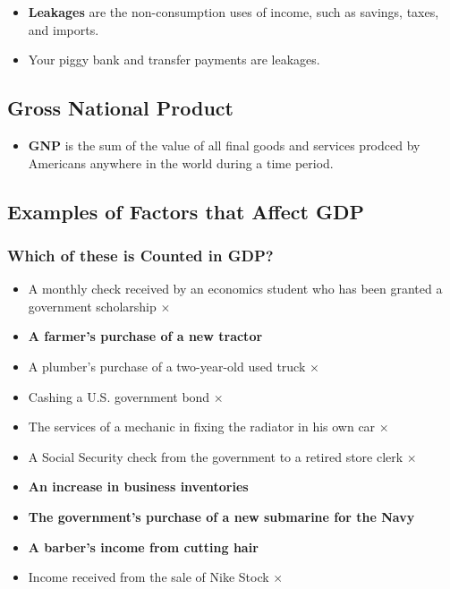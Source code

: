\documentclass[
  letterpaper,
  DIV=11,
  numbers=noendperiod]{scrartcl}
\providecommand{\tightlist}{%
  \setlength{\itemsep}{0pt}\setlength{\parskip}{0pt}}\usepackage{longtable,booktabs,array}
\begin{document}
\begin{itemize}
\tightlist
\item
  \textbf{Leakages} are the non-consumption uses of income, such as
  savings, taxes, and imports.
\item
  Your piggy bank and transfer payments are leakages.
\end{itemize}

\subsection{Gross National Product}\label{gross-national-product}

\begin{itemize}
\tightlist
\item
  \textbf{GNP} is the sum of the value of all final goods and services
  prodced by Americans anywhere in the world during a time period.
\end{itemize}

\subsection{Examples of Factors that Affect
GDP}\label{examples-of-factors-that-affect-gdp}

\subsubsection{Which of these is Counted in
GDP?}\label{which-of-these-is-counted-in-gdp}

\begin{itemize}
\tightlist
\item
  A monthly check received by an economics student who has been granted
  a government scholarship \(\times\)
\item
  \textbf{A farmer's purchase of a new tractor}
\item
  A plumber's purchase of a two-year-old used truck \(\times\)
\item
  Cashing a U.S. government bond \(\times\)
\item
  The services of a mechanic in fixing the radiator in his own car
  \(\times\)
\item
  A Social Security check from the government to a retired store clerk
  \(\times\)
\item
  \textbf{An increase in business inventories}
\item
  \textbf{The government's purchase of a new submarine for the Navy}
\item
  \textbf{A barber's income from cutting hair}
\item
  Income received from the sale of Nike Stock \(\times\)
\end{itemize}
\end{document}
